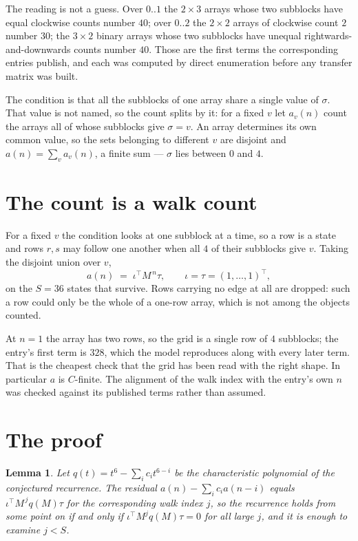 \documentclass[11pt,a4paper]{article}
\theoremstyle{plain}
\newtheorem{lemma}[theorem]{Lemma}
\theoremstyle{definition}
\begin{document}
The reading is not a guess. Over $0..1$ the $2\times3$ arrays whose two subblocks have equal
clockwise counts number $40$; over $0..2$ the $2\times2$ arrays of clockwise count $2$ number
$30$; the $3\times2$ binary arrays whose two subblocks have unequal rightwards-and-downwards
counts number $40$. Those are the first terms the corresponding entries publish, and each was
computed by direct enumeration before any transfer matrix was built.

The condition is that all the subblocks of one array share a single value of $\sigma$. That
value is not named, so the count splits by it: for a fixed $v$ let $a_v(n)$ count the arrays all
of whose subblocks give $\sigma=v$. An array determines its own common value, so the sets
belonging to different $v$ are disjoint and $a(n)=\sum_v a_v(n)$, a finite sum --- $\sigma$
lies between $0$ and $4$.

\section{The count is a walk count}

For a fixed $v$ the condition looks at one subblock at a time, so a row is
a state and rows $r,s$ may follow one another when all $4$ of their subblocks give $v$.
Taking the disjoint union over $v$,
\[
a(n)\;=\;\iota^{\!\top}M^{\,n}\tau,\qquad\iota=\tau=(1,\dots,1)^{\!\top},
\]
on the $S=36$ states that survive. Rows carrying no edge at all are dropped: such a row could
only be the whole of a one-row array, which is not among the objects counted.

At $n=1$ the array has two rows, so the grid is a single row of $4$
subblocks; the entry's first term is $328$, which the model
reproduces along with every later term. That is the cheapest check that the grid has been read
with the right shape.
In particular $a$ is $C$-finite. The alignment of the walk index with the entry's own $n$ was
checked against its published terms rather than assumed.

\section{The proof}

\begin{lemma}\label{lem:crit}
Let $q(t)=t^{6}-\sum_i c_it^{6-i}$ be the characteristic polynomial of the
conjectured recurrence. The residual $a(n)-\sum_ic_ia(n-i)$ equals
$\iota^{\!\top}M^{\,j}q(M)\tau$ for the corresponding walk index $j$, so the recurrence
holds from some point on if and only if $\iota^{\!\top}M^{j}q(M)\tau=0$ for all large $j$,
and it is enough to examine $j<S$.
\end{lemma}
\end{document}

